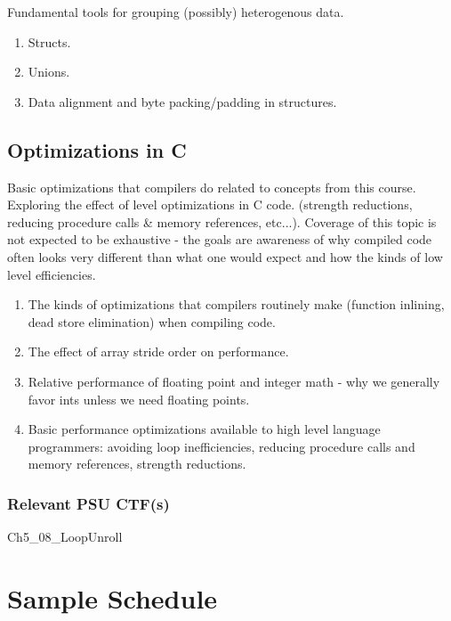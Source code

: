 \documentclass[12pt,letterpaper]{article}
\begin{document}
	Fundamental tools for grouping (possibly) heterogenous data.

	\begin{enumerate}
		\item Structs.
		\item Unions.
		\item Data alignment and byte packing/padding in structures. 
	\end{enumerate}


	\subsection{Optimizations in C}

	Basic optimizations that compilers do related to concepts from this course. Exploring the effect of level optimizations in C code. (strength reductions, reducing procedure calls \& memory references, etc...). Coverage of this topic is not expected to be exhaustive - the goals are awareness of why compiled code often looks very different than what one would expect and how the kinds of low level efficiencies.

	\begin{enumerate}
		\item The kinds of optimizations that compilers routinely make (function inlining, dead store elimination) when compiling code.
		\item The effect of array stride order on performance.
		\item Relative performance of floating point and integer math - why we generally favor ints unless we need floating points.
		\item Basic performance optimizations available to high level language programmers: avoiding loop inefficiencies, reducing procedure calls and memory references, strength reductions.
	\end{enumerate}

	\subsubsection*{Relevant PSU CTF(s)}

	Ch5\_08\_LoopUnroll

	\clearpage
	\section{Sample Schedule}
\end{document}
